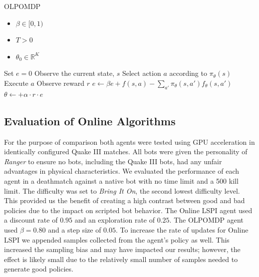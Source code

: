 \begin{algorithm}
\caption{OLPOMDP}
\label{olpomdp}
    {\fontsize{12}{10}\selectfont
    \begin{algorithmic}[1]
        \REQUIRE
            \begin{itemize} 
                \item $\beta \in [0,1)$ 
                \item $T > 0$ 
                \item $\theta_0 \in \mathbb{R}^K$ 
            \end{itemize}
    \STATE Set $e = 0$
        \STATE Observe the current state, $s$
        \STATE Select action $a$ according to $\pi_\theta(s)$
        \STATE Execute $a$
        \STATE Observe reward $r$
        \STATE $e \leftarrow \beta e + f(s,a) - \sum\limits_{a'}\pi_\theta(s,a')f_\theta(s,a')$
        \STATE $\theta \leftarrow + \alpha \cdot r \cdot e$
    \ENDFOR
    \end{algorithmic}
    }
\end{algorithm}

\subsection{Evaluation of Online Algorithms}

For the purpose of comparison both agents were tested using GPU acceleration in identically configured Quake III matches. All bots were given the personality of \emph{Ranger} to ensure no bots, including the Quake III bots, had any unfair advantages in physical characteristics. We evaluated the performance of each agent in a deathmatch against a native bot with no time limit and a 500 kill limit. The difficulty was set to \emph{Bring It On}, the second lowest difficulty level. This provided us the benefit of creating a high contrast between good and bad policies due to the impact on scripted bot behavior. The Online LSPI agent used a discount rate of $0.95$ and an exploration rate of $0.25$. The OLPOMDP agent used $\beta = 0.80$ and a step size of $0.05$. To increase the rate of updates for Online LSPI we appended samples collected from the agent's policy as well. This increased the sampling bias and may have impacted our results; however, the effect is likely small due to the relatively small number of samples needed to generate good policies.


